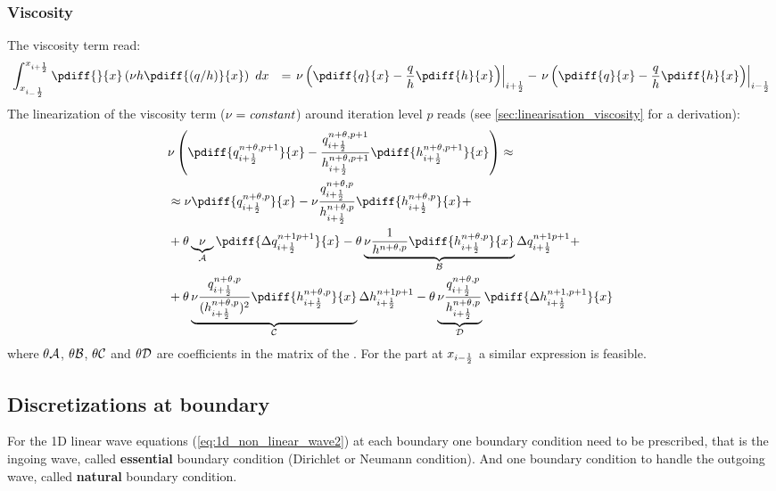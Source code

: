 \subsubsection{Viscosity}
The viscosity term read:
\begin{align}
    &  \int^{x_{i+\half}}_{x_{i_-\half}} \pdiff{}{x} \left( \nu h \pdiff{(q/h)}{x} \right)\ dx & =
    \left. \nu \left( \pdiff{q}{x} - \frac{q}{h} \pdiff{h}{x} \right) \right|_{i+\half} - \left. \nu \left( \pdiff{q}{x} - \frac{q}{h} \pdiff{h}{x} \right) \right|_{i-\half}
\end{align}
The linearization of the viscosity term ($\nu = {\it constant}$) around iteration level $p$ reads (see \autoref{sec:linearisation_viscosity} for a derivation):
\begin{align}
    &\nu \left(\pdiff{q^{n+\theta, p+1}_{i+\half}}{x} - \frac{q^{n+\theta, p+1}_{i+\half}}{h^{n+\theta, p+1}_{i+\half}} \pdiff{h^{n+\theta, p+1}_{i+\half}}{x} \right) \approx
    \\
    & \approx \nu  \pdiff{q^{n+\theta, p}_{i+\half}}{x}   -  \nu \frac{q^{n+\theta, p}_{i+\half}}{h^{n+\theta, p}_{i+\half}} \pdiff{h^{n+\theta, p}_{i+\half}}{x}  +
    \nonumber \\
    & + \theta \underbrace{\nu}_{\cal{A}} \pdiff{\Delta q^{n+1 p+1}_{i+\half}}{x}
    -  \theta \underbrace{\nu \frac{1}{h^{n+\theta, p}}\pdiff{h^{n+\theta, p}_{i+\half}}{x}}_{\cal{B}} \Delta q^{n+1 p+1}_{i+\half}  +
    \nonumber \\
    & + \theta \underbrace{\nu \frac{q^{n+\theta, p}_{i+\half}}{(h^{n+\theta, p}_{i+\half})^2} \pdiff{h^{n+\theta, p}_{i+\half}}{x}}_{\cal{C}} \Delta h^{n+1 p+1}_{i+\half}
    - \theta \underbrace{\nu \frac{q^{n+\theta, p}_{i+\half}}{h^{n+\theta, p}_{i+\half}}}_{\cal{D}} \pdiff{\Delta h^{n+1, p+1}_{i+\half}}{x}
\end{align}
where $\theta \cal{A}$, $\theta \cal{B}$, $\theta \cal{C}$ and $\theta \cal{D}$ are coefficients in the matrix of the \deltaformulation.
For the part at $x_{i-\frac{1}{2}}$ a similar expression is feasible.

\subsection{Discretizations at boundary}
For the 1D linear wave equations (\autoref{eq:1d_non_linear_wave2}) at each boundary one boundary condition need to be prescribed, that is the ingoing wave, called \textbf{essential} boundary condition (Dirichlet or Neumann condition).
And one boundary condition to handle the outgoing wave, called \textbf{natural} boundary condition.

